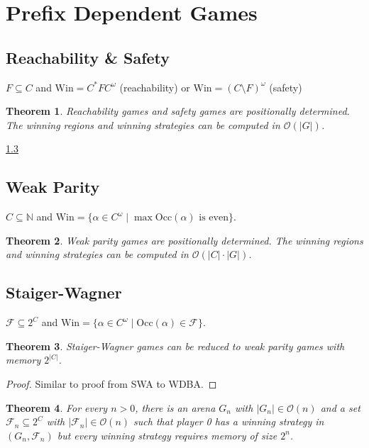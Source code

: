 \documentclass{article}
\newtheorem{theorem}{Theorem}
\begin{document}
\newpage

\section{Prefix Dependent Games}
\subsection{Reachability \& Safety}
$F \subseteq C$ and $\text{Win} = C^* F C^\omega$ (reachability) or $\text{Win} = (C \setminus F)^\omega$ (safety)

\begin{theorem}
	Reachability games and safety games are positionally determined. The winning regions and winning strategies can be computed in $\mathcal{O}(|G|)$.
\end{theorem}
\ref{} %

\subsection{Weak Parity}
$C \subseteq \mathbb{N}$ and $\text{Win} = \{ \alpha \in C^\omega \mid \max \text{Occ}(\alpha) \text{ is even}\}$.

\begin{theorem}
	Weak parity games are positionally determined. The winning regions and winning strategies can be computed in $\mathcal{O}(|C| \cdot |G|)$.
\end{theorem}

\subsection{Staiger-Wagner}
$\mathcal{F} \subseteq 2^C$ and $\text{Win} = \{ \alpha \in C^\omega \mid \text{Occ}(\alpha) \in \mathcal{F} \}$.

\begin{theorem}
	Staiger-Wagner games can be reduced to weak parity games with memory $2^{|C|}$.
\end{theorem}
\begin{proof}
	Similar to proof from SWA to WDBA.
\end{proof}

\begin{theorem}
	For every $n > 0$, there is an arena $G_n$ with $|G_n| \in \mathcal{O}(n)$ and a set $\mathcal{F}_n \subseteq 2^C$ with $|\mathcal{F}_n| \in \mathcal{O}(n)$ such that player 0 has a winning strategy in $(G_n, \mathcal{F}_n)$ but every winning strategy requires memory of size $2^n$.
\end{theorem}
\end{document}
